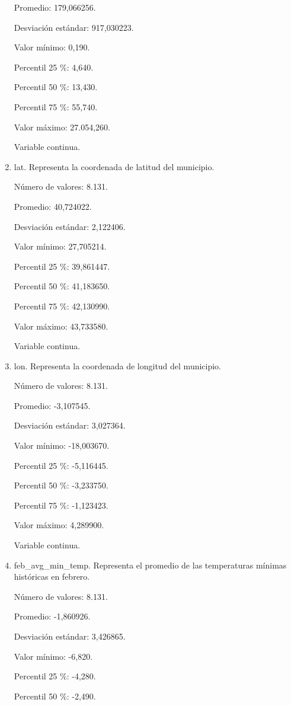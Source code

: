 \begin{enumerate}
	Promedio: 179,066256.
	
	Desviación estándar: 917,030223.
	
	Valor mínimo: 0,190.
	
	Percentil 25 \%: 4,640.
	
	Percentil 50 \%: 13,430.
	
	Percentil 75 \%: 55,740.
	
	Valor máximo: 27.054,260.
	
	Variable continua.

	\item lat. Representa la coordenada de latitud del municipio.
	
	Número de valores: 8.131.
	
	Promedio: 40,724022.
	
	Desviación estándar: 2,122406.
	
	Valor mínimo: 27,705214.
	
	Percentil 25 \%: 39,861447.
	
	Percentil 50 \%: 41,183650.
	
	Percentil 75 \%: 42,130990.
	
	Valor máximo: 43,733580.
	
	Variable continua.

	\item lon. Representa la coordenada de longitud del municipio.
	
	Número de valores: 8.131.
	
	Promedio: -3,107545.
	
	Desviación estándar: 3,027364.
	
	Valor mínimo: -18,003670.
	
	Percentil 25 \%: -5,116445.
	
	Percentil 50 \%: -3,233750.
	
	Percentil 75 \%: -1,123423.
	
	Valor máximo: 4,289900.
	
	Variable continua.

	\item feb\_avg\_min\_temp. Representa el promedio de las temperaturas mínimas históricas en febrero.
	
	Número de valores: 8.131.
	
	Promedio: -1,860926.
	
	Desviación estándar: 3,426865.
	
	Valor mínimo: -6,820.
	
	Percentil 25 \%: -4,280.
	
	Percentil 50 \%: -2,490.
	

\end{enumerate}
